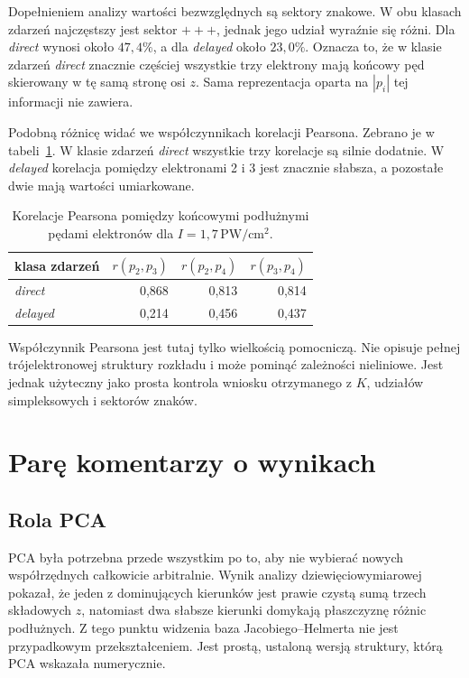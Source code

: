 \documentclass[12pt,letterpaper,oneside]{report}
\numberwithin{equation}{chapter}
\numberwithin{figure}{chapter}
\numberwithin{table}{chapter}
\newcommand{\direct}{\textit{direct}}
\newcommand{\delayed}{\textit{delayed}}
\begin{document}
Dopełnieniem analizy wartości bezwzględnych są sektory znakowe. W obu klasach zdarzeń najczęstszy jest sektor $+++$, jednak jego udział wyraźnie się różni. Dla \direct{} wynosi około $47{,}4\%$, a dla \delayed{} około $23{,}0\%$. Oznacza to, że w klasie zdarzeń \direct{} znacznie częściej wszystkie trzy elektrony mają końcowy pęd skierowany w tę samą stronę osi $z$. Sama reprezentacja oparta na $|p_i|$ tej informacji nie zawiera.

Podobną różnicę widać we współczynnikach korelacji Pearsona. Zebrano je w tabeli~\ref{tab:corr}. W klasie zdarzeń \direct{} wszystkie trzy korelacje są silnie dodatnie. W \delayed{} korelacja pomiędzy elektronami 2 i 3 jest znacznie słabsza, a pozostałe dwie mają wartości umiarkowane.

\begin{table}[htbp]
\centering
\caption{Korelacje Pearsona pomiędzy końcowymi podłużnymi pędami elektronów dla $I=1{,}7\,\mathrm{PW/cm^2}$.}
\label{tab:corr}
\begin{tabular}{lrrr}
\toprule
klasa zdarzeń & $r(p_2,p_3)$ & $r(p_2,p_4)$ & $r(p_3,p_4)$\\
\midrule
\direct  & 0,868 & 0,813 & 0,814\\
\delayed & 0,214 & 0,456 & 0,437\\
\bottomrule
\end{tabular}
\end{table}

Współczynnik Pearsona jest tutaj tylko wielkością pomocniczą. Nie opisuje pełnej trójelektronowej struktury rozkładu i może pominąć zależności nieliniowe. Jest jednak użyteczny jako prosta kontrola wniosku otrzymanego z $K$, udziałów simpleksowych i sektorów znaków.

\chapter{Parę komentarzy o wynikach}

\section{Rola PCA}

PCA była potrzebna przede wszystkim po to, aby nie wybierać nowych współrzędnych całkowicie arbitralnie. Wynik analizy dziewięciowymiarowej pokazał, że jeden z dominujących kierunków jest prawie czystą sumą trzech składowych $z$, natomiast dwa słabsze kierunki domykają płaszczyznę różnic podłużnych. Z tego punktu widzenia baza Jacobiego--Helmerta nie jest przypadkowym przekształceniem. Jest prostą, ustaloną wersją struktury, którą PCA wskazała numerycznie.
\end{document}
